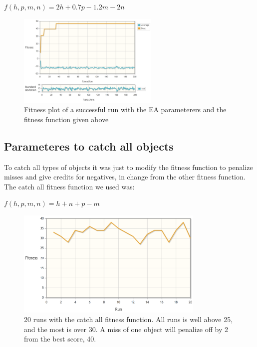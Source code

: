 \begin{center}
$f(h,p,m,n) = 2h + 0.7p - 1.2m - 2n$
\end{center}

\begin{figure}[h]
  \centering
    \includegraphics[width=0.6\textwidth]{img/tracker_mainrun}
    \caption{Fitness plot of a successful run with the EA parameterers and the fitness function given above}
\end{figure}

\subsection{Parameteres to catch all objects}
To catch all types of objects it was just to modify the fitness function to penalize misses and give credits for negatives, in change from the other fitness function. The catch all fitness function we used was:

\begin{center}
$f(h,p,m,n) = h + n + p - m$
\end{center}


\begin{figure}[h]
  \centering
    \includegraphics[width=0.8\textwidth]{img/catch_all}
    \caption{20 runs with the catch all fitness function. All runs is well above 25, and the most is over 30. A miss of one object will penalize off by 2 from the best score, 40.}
\end{figure}


